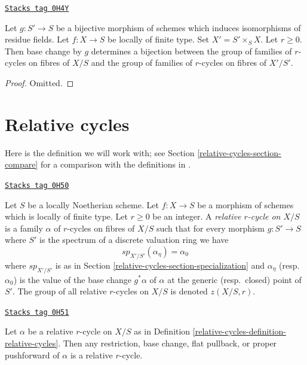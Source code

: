 \begin{lemma}
\label{relative-cycles-lemma-pullback-universally-bijective}
\href{https://stacks.math.columbia.edu/tag/0H4Y}{\texttt{Stacks tag 0H4Y}}

Let $g : S' \to S$ be a bijective morphism of schemes
which induces isomorphisms of residue fields.
Let $f : X \to S$ be locally of finite type. Set $X' = S' \times_S X$.
Let $r \geq 0$. Then base change by $g$ determines a bijection
between the group of families of $r$-cycles on fibres of $X/S$ and
the group of families of $r$-cycles on fibres of $X'/S'$.
\end{lemma}

\begin{proof}
Omitted.
\end{proof}

\section{Relative cycles}
\label{relative-cycles-section-families-specialization}
Here is the definition we will work with; see Section \ref{relative-cycles-section-compare}
for a comparison with the definitions in \cite{SV}.

\begin{definition}
\label{relative-cycles-definition-relative-cycles}
\href{https://stacks.math.columbia.edu/tag/0H50}{\texttt{Stacks tag 0H50}}

Let $S$ be a locally Noetherian scheme. Let $f : X \to S$ be a morphism of
schemes which is locally of finite type. Let $r \geq 0$ be an integer.
A {\it relative $r$-cycle on $X/S$} is a family $\alpha$ of $r$-cycles
on fibres of $X/S$ such that for every morphism $g : S' \to S$
where $S'$ is the spectrum of a discrete valuation ring we have
$$
sp_{X'/S'}(\alpha_\eta) = \alpha_0
$$
where $sp_{X'/S'}$ is as in Section \ref{relative-cycles-section-specialization}
and $\alpha_\eta$ (resp.\ $\alpha_0$) is the value of the base change
$g^*\alpha$ of $\alpha$ at the generic (resp.\ closed) point of $S'$.
The group of all relative $r$-cycles on $X/S$ is denoted $z(X/S, r)$.
\end{definition}

\begin{lemma}
\label{relative-cycles-lemma-relative-cycle-functoriality}
\href{https://stacks.math.columbia.edu/tag/0H51}{\texttt{Stacks tag 0H51}}

Let $\alpha$ be a relative $r$-cycle on $X/S$ as in
Definition \ref{relative-cycles-definition-relative-cycles}.
Then any restriction, base change, flat pullback, or proper pushforward
of $\alpha$ is a relative $r$-cycle.
\end{lemma}

